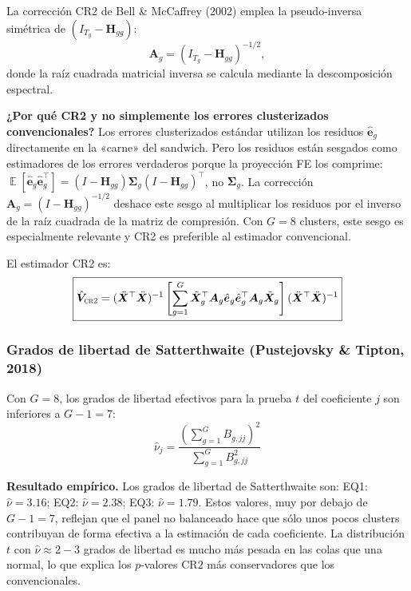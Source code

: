 \documentclass[12pt, a4paper]{article}
\theoremstyle{definition}
\DeclareMathOperator{\E}{\mathbb{E}}
\begin{document}
La corrección CR2 de Bell \& McCaffrey (2002) emplea la pseudo-inversa simétrica de $(I_{T_g} - \bm{H}_{gg})$:
\[
  \bm{A}_g = (I_{T_g} - \bm{H}_{gg})^{-1/2},
\]
donde la raíz cuadrada matricial inversa se calcula mediante la descomposición espectral.

\begin{intuitionbox}
\textbf{¿Por qué CR2 y no simplemente los errores clusterizados convencionales?} Los errores clusterizados estándar utilizan los residuos $\hat{\bm{e}}_g$ directamente en la «carne» del sandwich. Pero los residuos están sesgados como estimadores de los errores verdaderos porque la proyección FE los comprime: $\E[\hat{\bm{e}}_g\hat{\bm{e}}_g^\top] = (I - \bm{H}_{gg})\bm{\Sigma}_g(I - \bm{H}_{gg})^\top$, no $\bm{\Sigma}_g$. La corrección $\bm{A}_g = (I - \bm{H}_{gg})^{-1/2}$ deshace este sesgo al multiplicar los residuos por el inverso de la raíz cuadrada de la matriz de compresión. Con $G = 8$ clusters, este sesgo es especialmente relevante y CR2 es preferible al estimador convencional.
\end{intuitionbox}

El estimador CR2 es:
\[
  \boxed{\hat{\bm{V}}_{\textsc{cr2}} = (\ddot{\bm{X}}^\top\ddot{\bm{X}})^{-1}
  \left[\sum_{g=1}^{G} \tilde{\bm{X}}_g^\top \bm{A}_g \hat{\bm{e}}_g \hat{\bm{e}}_g^\top \bm{A}_g \tilde{\bm{X}}_g\right]
  (\ddot{\bm{X}}^\top\ddot{\bm{X}})^{-1}}
\]

\subsubsection{Grados de libertad de Satterthwaite (Pustejovsky \& Tipton, 2018)}

Con $G = 8$, los grados de libertad efectivos para la prueba $t$ del coeficiente $j$ son inferiores a $G - 1 = 7$:
\[
  \boxed{\hat{\nu}_j = \frac{\left(\displaystyle\sum_{g=1}^{G} B_{g,jj}\right)^2}{\displaystyle\sum_{g=1}^{G} B_{g,jj}^2}}
\]

\begin{resultbox}
\textbf{Resultado empírico.} Los grados de libertad de Satterthwaite son: EQ1: $\hat\nu = 3.16$; EQ2: $\hat\nu = 2.38$; EQ3: $\hat\nu = 1.79$. Estos valores, muy por debajo de $G - 1 = 7$, reflejan que el panel no balanceado hace que sólo unos pocos clusters contribuyan de forma efectiva a la estimación de cada coeficiente. La distribución $t$ con $\hat\nu \approx 2{-}3$ grados de libertad es mucho más pesada en las colas que una normal, lo que explica los $p$-valores CR2 más conservadores que los convencionales.
\end{resultbox}
\end{document}
